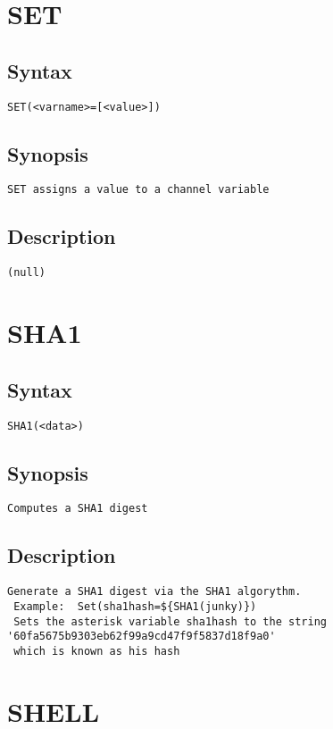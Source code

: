 \section{SET}
\subsection{Syntax}
\begin{verbatim}
SET(<varname>=[<value>])
\end{verbatim}
\subsection{Synopsis}
\begin{verbatim}
SET assigns a value to a channel variable
\end{verbatim}
\subsection{Description}
\begin{verbatim}
(null)
\end{verbatim}


\section{SHA1}
\subsection{Syntax}
\begin{verbatim}
SHA1(<data>)
\end{verbatim}
\subsection{Synopsis}
\begin{verbatim}
Computes a SHA1 digest
\end{verbatim}
\subsection{Description}
\begin{verbatim}
Generate a SHA1 digest via the SHA1 algorythm.
 Example:  Set(sha1hash=${SHA1(junky)})
 Sets the asterisk variable sha1hash to the string '60fa5675b9303eb62f99a9cd47f9f5837d18f9a0'
 which is known as his hash

\end{verbatim}


\section{SHELL}

